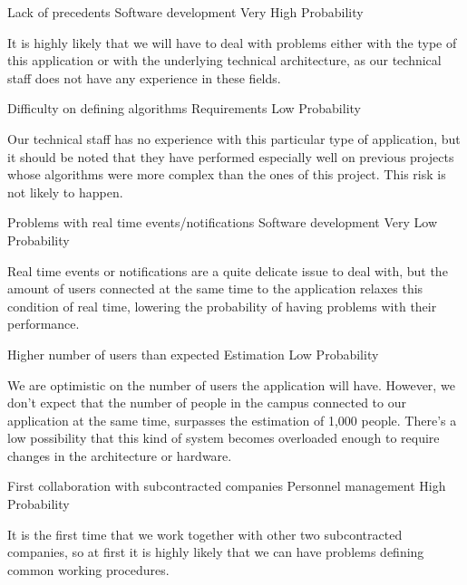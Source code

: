 \begin{risk}[riskPrec]{Lack of precedents}
\riskcat Software development
 Very High Probability

It is highly likely that we will have to deal with problems either with the type of this application or with the underlying technical architecture, as our technical staff does not have any experience in these fields.
\end{risk}

\begin{risk}[riskAlgorithms]{Difficulty on defining algorithms}
\riskcat Requirements
 Low Probability

Our technical staff has no experience with this particular type of application, but it should be noted that they have performed especially well on previous projects whose algorithms were more complex than the ones of this project. This risk is not likely to happen.
\end{risk}

\begin{risk}[riskRealTime]{Problems with real time events/notifications}
\riskcat Software development
 Very Low Probability

Real time events or notifications are a quite delicate issue to deal with, but the amount of users connected at the same time to the application relaxes this condition of real time, lowering the probability of having problems with their performance.
\end{risk}

\begin{risk}[riskUserLoad]{Higher number of users than expected}
\riskcat Estimation
 Low Probability

We are optimistic on the number of users the application will have. However, we don't expect that the number of people in the campus connected to our application at the same time, surpasses the estimation of 1,000 people. There's a low possibility that this kind of system becomes overloaded enough to require changes in the architecture or hardware.
\end{risk}

\begin{risk}[riskCollaboration]{First collaboration with subcontracted companies}
\riskcat Personnel management
 High Probability

It is the first time that we work together with other two subcontracted companies, so at first it is highly likely that we can have problems defining common working procedures.
\end{risk}

